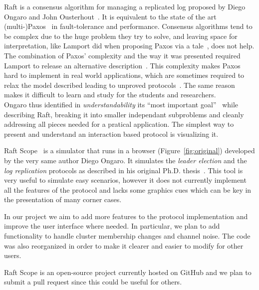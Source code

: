 Raft is a consensus algorithm for managing a replicated log
proposed by Diego Ongaro and John Ousterhout~\cite{ongaro2014search}.
It is equivalent to the state of the art (multi-)Paxos~\cite{lamport1998part} in fault-tolerance and performance.
Consensus algorithms tend to be complex due to the huge problem they try to solve,
and leaving space for interpretation, like Lamport
did when proposing Paxos via a tale~\cite{lamport1998part}, does not help.
The combination of Paxos' complexity and the way it was presented required
Lamport to release an alternative description~\cite{lamport2001paxos}.
This complexity makes Paxos hard to implement in real world applications, which are sometimes
required to relax the model described leading to unproved protocols~\cite{chandra2007paxos}.
The same reason makes it difficult to learn and study for the students and researchers.\\

Ongaro thus identified in \emph{understandability} its ``most important goal''~\cite{ongaro2014consensus}
while describing Raft, breaking it into smaller independant subproblems and cleanly addressing all pieces needed
for a pratical application.
The simplest way to present and understand an interaction based
protocol is visualizing it.

Raft Scope~\cite{raftscope} is a simulator that runs in a browser (Figure~\ref{fig:original}) developed by the very same
author Diego Ongaro.
It simulates the \emph{leader election} and the \emph{log replication}
protocols as described in his original Ph.D. thesis~\cite{ongaro2014consensus}.
This tool is very useful to simulate easy scenarios,
however it does not currently implement all the features of the protocol and lacks
some graphics cues which can be key in the presentation of many corner cases.

In our project we aim to add more features to the protocol implementation and improve the user interface where needed.
In particular, we plan to add functionality to handle cluster membership changes and channel noise.
 The code was also reorganized in order to make it clearer and easier to modify for other users.

Raft Scope is an open-source project currently hosted on GitHub and we plan to
submit a pull request since this could be useful for others.

\newpage